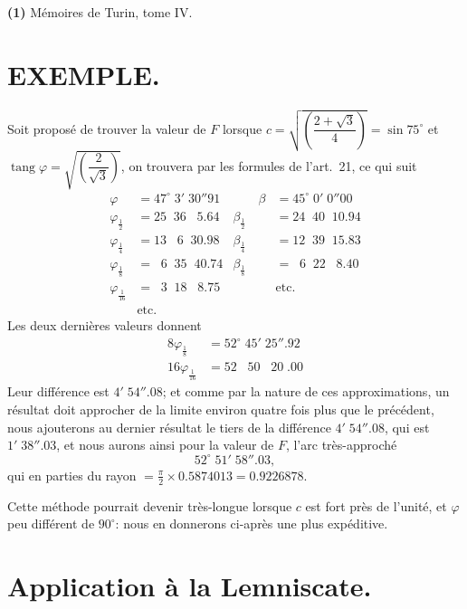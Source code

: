 \documentclass{article}
\begin{document}
\textbf{(1)} Mémoires de Turin, tome IV.

\section*{EXEMPLE.}

Soit proposé de trouver la valeur de $F$ lorsque $c=\sqrt{\left(\dfrac{2+\sqrt{3}}{4}\right)}=\sin 75^{\circ}$ et $\operatorname{tang}\varphi=\sqrt{\left(\dfrac{2}{\sqrt{3}}\right)}$, on trouvera par les formules de l'art.\ 21, ce qui suit
\[ \begin{aligned} \varphi &= 47^{\circ}\;3'\;30''91 & \qquad \beta &= 45^{\circ}\;0'\;0''00 \\ \varphi_{\frac{1}{2}} &= 25\;\;36\;\;\;5.64 & \beta_{\frac{1}{2}} &= 24\;\;40\;\;10.94 \\ \varphi_{\frac{1}{4}} &= 13\;\;\;6\;\;30.98 & \beta_{\frac{1}{4}} &= 12\;\;39\;\;15.83 \\ \varphi_{\frac{1}{8}} &= \;\;6\;\;35\;\;40.74 & \beta_{\frac{1}{8}} &= \;\;6\;\;22\;\;\;8.40 \\ \varphi_{\frac{1}{16}} &= \;\;3\;\;18\;\;\;8.75 & &\text{etc.} \\ &\text{etc.} & & \end{aligned} \]
Les deux dernières valeurs donnent
\[ \begin{aligned} 8\varphi_{\frac{1}{8}} &= 52^{\circ}\;45'\;25''.92 \\ 16\varphi_{\frac{1}{16}} &= 52\;\;\;50\;\;\;20\;.00 \end{aligned} \]
Leur différence est $4'\;54''.08$; et comme par la nature de ces approximations, un résultat doit approcher de la limite environ quatre fois plus que le précédent, nous ajouterons au dernier résultat le tiers de la différence $4'\;54''.08$, qui est $1'\;38''.03$, et nous aurons ainsi pour la valeur de $F$, l'arc très-approché
\[ 52^{\circ}\;51'\;58''.03, \]
qui en parties du rayon $=\frac{\pi}{2}\times 0.5874013=0.9226878$.

Cette méthode pourrait devenir très-longue lorsque $c$ est fort près de l'unité, et $\varphi$ peu différent de $90^{\circ}$: nous en donnerons ci-après une plus expéditive.

\section*{Application à la Lemniscate.}
\end{document}
